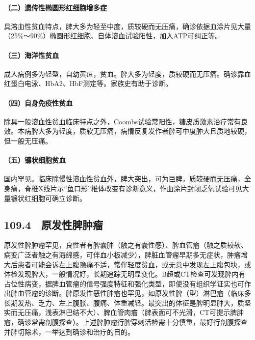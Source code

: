 \paragraph{（二）遗传性椭圆形红细胞增多症}

具溶血性贫血特点，脾大多为轻至中度，质较硬而无压痛，确诊依据血涂片见大量（25\%～90\%）椭圆形红细胞、自体溶血试验阳性，加入ATP可纠正等。

\paragraph{（三）海洋性贫血}

成人病例多为轻型，自幼黄疸，贫血。脾大多为轻度，质较硬而无压痛。确诊靠血红蛋白电泳、HbA2、HbF测定等。家族史有助于诊断。

\paragraph{（四）自身免疫性贫血}

除具一般溶血性贫血临床特点之外，Coombs试验常阳性，糖皮质激素治疗常有良效。本病脾大多为轻度，质软无压痛，病情反复发作者脾可中度肿大且质地较硬，但一般无压痛。

\paragraph{（五）镰状细胞贫血}

国内罕见。临床除慢性溶血性贫血外，脾大突出，可为巨脾，质较硬而无压痛，全身痛，脊椎X线片示“鱼口形”椎体改变有诊断意义，作血涂片封闭乏氧试验可见大量镰状红细胞可确立诊断。

\protect\hypertarget{text00249.html}{}{}

\subsection{109.4　原发性脾肿瘤}

原发性脾肿瘤罕见，良性者有脾囊肿（触之有囊性感）、脾血管瘤（触之质较软、病变广泛者触之有海绵感，可伴血小板减少），脾脏血管瘤早期多无症状，肿瘤增大后患者可能会诉左上腹隐痛不适，常伴轻度贫血，或无意中发现左上腹包块，或体检发现脾大，一般情况好，长期追踪无明显变化。B超或CT检查可发现脾内有占位性病变，据脾血管瘤的信号强度特征和强化类型，即使没有组织学证实也可作出脾血管瘤的诊断。脾原发性恶性肿瘤也罕见，如原发性脾（型）淋巴瘤（临床多长期发热、乏力、左上腹胀、腹痛、体重减轻。最突出的体征是脾明显肿大，质坚实而无压痛，浅表淋巴结不大）、脾血管肉瘤（脾表面可不光滑，CT可提示脾肿瘤，确诊常需剖腹探查）。上述脾肿瘤行脾穿刺活检需十分慎重，最好行剖腹探查并脾切除术，一举达到确诊和治疗的目的。

